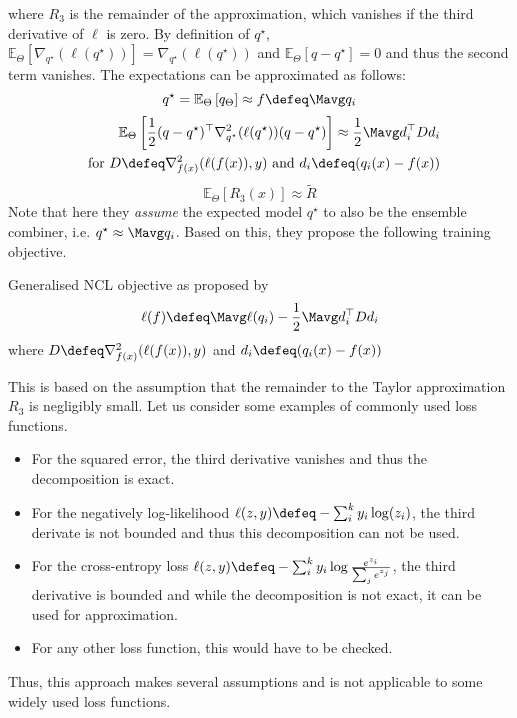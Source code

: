 \documentclass[../main.tex]{subfiles}
\begin{document}
where $R_{3}$ is the remainder of the approximation, which vanishes if the third derivative of $\ell$ is zero.
By definition of $q^\star$, $\mathbb{E}_{\Theta}\left[ \nabla_{q^\star}(\ell(q^\star)) \right] = \nabla_{q^\star}(\ell(q^\star))$ and $\mathbb{E}_{\Theta}\left[ q-q^\star \right] = 0$ and thus the second term vanishes.
The expectations can be approximated as follows:
$$
q^\star = \mathbb{E}_{{\Theta}}\left[ q_{\Theta} \right] \approx f \defeq \Mavg q_{i}
$$
\begin{align*}
\mathbb{E}_{\Theta}\left[ \frac{1}{2} (q-q^\star)^\top\nabla^2_{q^\star}(\ell(q^\star))(q-q^\star) \right] \approx \frac{1}{2}\Mavg d_{i}^\top D d_{i} \\
\text{~~for $D \defeq \nabla^2_{f(x)}(\ell(f(x)),y)$ and $d_{i} \defeq (q_{i}(x) - f(x))$}
\end{align*}
\vspace{0.5em}
$$
\mathbb{E}_{\Theta}\left[ R_{3}(x) \right]  \approx \tilde{R}
$$
Note that here they \textit{assume} the expected model $q^\star$ to also be the ensemble combiner, i.e. $q^\star \approx \Mavg q_{i}$. 
Based on this, they propose the following training objective.
\begin{definition} Generalised NCL objective as proposed by \cite{buschj}
    \label{def:buschj-ncl-objective}
$$
\ell(f) \defeq \Mavg \ell(q_{i}) - \frac{1}{2} \Mavg d_{i}^\top D d_{i}
$$
where $D \defeq \nabla^2_{f(x)}(\ell(f(x)),y)$ and $d_{i} \defeq (q_{i}(x) - f(x))$
\end{definition}
This is based on the assumption that the remainder to the Taylor approximation $R_{3}$ is negligibly small. Let us consider some examples of commonly used loss functions.
\begin{itemize}
\item For the squared error, the third derivative vanishes and thus the decomposition is exact.
\item For the negatively log-likelihood $\ell(z,y) \defeq - \sum_{i}^k y_{i}\log(z_{i})$, the third derivate is not bounded and thus this decomposition can not be used.
\item For the cross-entropy loss $\ell(z,y) \defeq - \sum_{i}^k y_{i} \log \frac{e^{z_{i}}}{\sum_{j}e^{z_{j}}}$, the third derivative is bounded and while the decomposition is not exact, it can be used for approximation. %
\item For any other loss function, this would have to be checked.
\end{itemize}
Thus, this approach makes several assumptions and is not applicable to some widely used loss functions.
\end{document}
